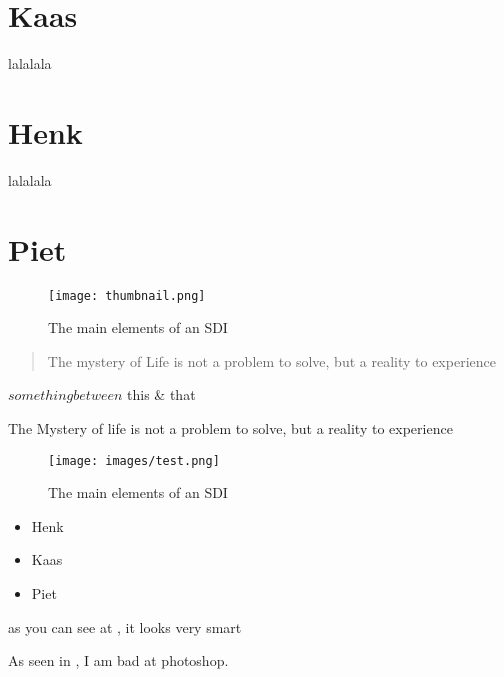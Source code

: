 \section{Kaas}
lalalala 


\section{Henk}
lalalala 


\section{Piet}
\begin{figure}
    \centering
    \graphicspath{ {images/} }
    \texttt{[image: thumbnail.png]}
    \caption{The main elements of an SDI}
    \label{fig:thumbnail}
\end{figure}

\begin{quote}
    The mystery of Life is not a problem to solve, but a reality to experience \cite{einstein}
\end{quote}



\(something between\) this \& that 

The Mystery of life is not a problem to solve, but a reality to experience
\cite{einstein}

\begin{figure}
    \centering
    \texttt{[image: images/test.png]}
    \caption{The main elements of an SDI}
    \label{fig:thingie} %
\end{figure}


\begin{itemize}
    \item Henk
    \item Kaas
    \item Piet
\end{itemize}

as you can see at , it looks very smart


As seen in , I am bad at photoshop.
